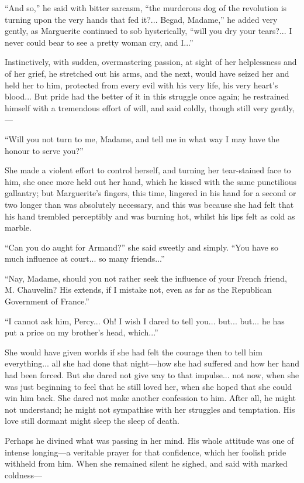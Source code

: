 \enquote{And so,} he said with bitter sarcasm, \enquote{the murderous dog of the revolution is turning upon the very hands that fed it?... Begad, Madame,} he added very gently, as Marguerite continued to sob hysterically, \enquote{will you dry your tears?... I never could bear to see a pretty woman cry, and I...}

Instinctively, with sudden, overmastering passion, at sight of her helplessness and of her grief, he stretched out his arms, and the next, would have seized her and held her to him, protected from every evil with his very life, his very heart's blood... But pride had the better of it in this struggle once again; he restrained himself with a tremendous effort of will, and said coldly, though still very gently,---

\enquote{Will you not turn to me, Madame, and tell me in what way I may have the honour to serve you?}

She made a violent effort to control herself, and turning her tear-stained face to him, she once more held out her hand, which he kissed with the same punctilious gallantry; but Marguerite's fingers, this time, lingered in his hand for a second or two longer than was absolutely necessary, and this was because she had felt that his hand trembled perceptibly and was burning hot, whilst his lips felt as cold as marble.

\enquote{Can you do aught for Armand?} she said sweetly and simply. \enquote{You have so much influence at court... so many friends...}

\enquote{Nay, Madame, should you not rather seek the influence of your French friend, M. Chauvelin? His extends, if I mistake not, even as far as the Republican Government of France.}

\enquote{I cannot ask him, Percy... Oh! I wish I dared to tell you... but... but... he has put a price on my brother's head, which...}

She would have given worlds if she had felt the courage then to tell him everything... all she had done that night---how she had suffered and how her hand had been forced. But she dared not give way to that impulse... not now, when she was just beginning to feel that he still loved her, when she hoped that she could win him back. She dared not make another confession to him. After all, he might not understand; he might not sympathise with her struggles and temptation. His love still dormant might sleep the sleep of death.

Perhaps he divined what was passing in her mind. His whole attitude was one of intense longing---a veritable prayer for that confidence, which her foolish pride withheld from him. When she remained silent he sighed, and said with marked coldness---

